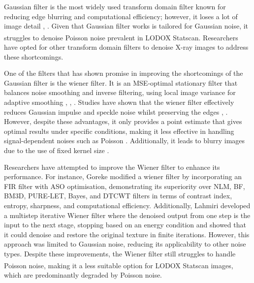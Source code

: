 Gaussian filter is the most widely used transform domain filter known for reducing edge blurring and computational efficiency; however, it loses a lot of image detail \cite{juneja_denoising_2024}
, \cite{khan_new_2016}. Given that Gaussian filter works is tailored for Gaussian noise, it struggles to denoise Poisson noise prevalent in LODOX\textsuperscript{\textregistered} Statscan\textsuperscript{\textregistered}. Researchers have opted for other transform domain filters to denoise X-ray images to address these shortcomings. 

One of the filters that has shown promise in improving the shortcomings of the Gaussian filter is the wiener filter. It is an \gls{MSE}-optimal stationary filter that balances noise smoothing and inverse filtering, using local image variance for adaptive smoothing \cite{juneja_denoising_2024}, \cite{chandra_analysis_2020}, \cite{noauthor_wiener_nodate}. Studies have shown that the wiener filter effectively reduces Gaussian impulse and speckle noise whilst preserving the edges \cite{chandra_analysis_2020}, \cite{wang_noise_2008}.  However, despite these advantages, it only provides a point estimate that gives optimal results under specific conditions, making it less effective in handling signal-dependent noises such as Poisson \cite{juneja_denoising_2024}. Additionally, it leads to blurry images due to the use of fixed kernel size \cite{chandra_analysis_2020}.

Researchers have attempted to improve the Wiener filter to enhance its performance. For instance, Goreke \cite{goreke_novel_2023} modified a wiener filter by incorporating an \gls{FIR} filter with \gls{ASO} optimisation, demonstrating its superiority over \gls{NLM}, \gls{BF}, \gls{BM3D}, \gls{PURE-LET}, Bayes, and \gls{DTCWT} filters in terms of contrast index, entropy, sharpness, and computational efficiency. Additionally, Lahmiri \cite{lahmiri_iterative_2017} developed a multistep iterative Wiener filter where the denoised output from one step is the input to the next stage, stopping based on an energy condition and showed that it could denoise and restore the original texture in finite iterations. However, this approach was limited to Gaussian noise\cite{lahmiri_iterative_2017}, reducing its applicability to other noise types. Despite these improvements, the Wiener filter still struggles to handle Poisson noise, making it a less suitable option for LODOX\textsuperscript{\textregistered} Statscan\textsuperscript{\textregistered} images, which are predominantly degraded by Poisson noise.

